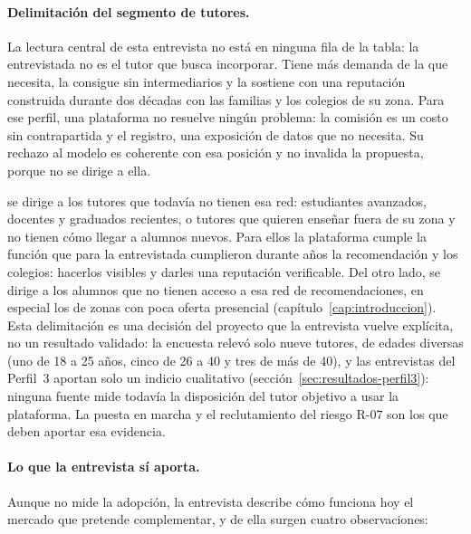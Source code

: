 \paragraph{Delimitación del segmento de tutores.} La lectura central de
esta entrevista no está en ninguna fila de la tabla: la entrevistada no
es el tutor que \sistema{} busca incorporar. Tiene más demanda de la que
necesita, la consigue sin intermediarios y la sostiene con una
reputación construida durante dos décadas con las familias y los
colegios de su zona. Para ese perfil, una plataforma no resuelve ningún
problema: la comisión es un costo sin contrapartida y el registro, una
exposición de datos que no necesita. Su rechazo al modelo es coherente
con esa posición y no invalida la propuesta, porque \sistema{} no se
dirige a ella.

\sistema{} se dirige a los tutores que todavía no tienen esa red:
estudiantes avanzados, docentes y graduados recientes, o tutores que
quieren enseñar fuera de su zona y no tienen cómo llegar a alumnos
nuevos. Para ellos la plataforma cumple la función que para la
entrevistada cumplieron durante años la recomendación y los colegios:
hacerlos visibles y darles una reputación verificable. Del otro lado, se
dirige a los alumnos que no tienen acceso a esa red de recomendaciones,
en especial los de zonas con poca oferta presencial
(capítulo~\ref{cap:introduccion}). Esta delimitación es una decisión del
proyecto que la entrevista vuelve explícita, no un resultado validado:
la encuesta relevó solo nueve tutores, de edades diversas (uno de 18 a 25
años, cinco de 26 a 40 y tres de más de 40), y las entrevistas del
Perfil~3 aportan solo un indicio cualitativo
(sección~\ref{sec:resultados-perfil3}): ninguna fuente mide todavía la
disposición del tutor objetivo a usar la plataforma. La
puesta en marcha y el reclutamiento del riesgo R-07 son los que deben
aportar esa evidencia.

\paragraph{Lo que la entrevista sí aporta.} Aunque no mide la adopción,
la entrevista describe cómo funciona hoy el mercado que \sistema{}
pretende complementar, y de ella surgen cuatro observaciones:

